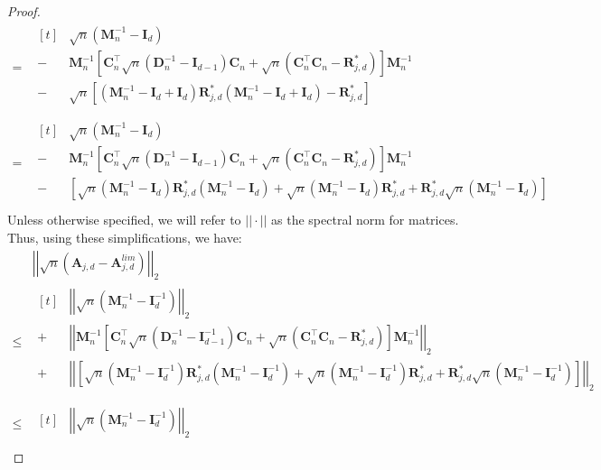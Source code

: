 \documentclass[10pt,a4paper]{amsart}
\newcommand{\bA}{\boldsymbol{A}}
\newcommand{\bC}{\boldsymbol{C}}
\newcommand{\bD}{\boldsymbol{D}}
\newcommand{\bI}{\boldsymbol{I}}
\newcommand{\bM}{\boldsymbol{M}}
\newcommand{\bR}{\boldsymbol{R}}
\begin{document}
\begin{proof}
\begin{equation}
\begin{split}
    = & \!\begin{aligned}[t]
        & \sqrt{n}\left(\bM_n^{-1} - \bI_d\right)\\
        - & \bM_n^{-1}\left[\bC_n^\top \sqrt{n}(\bD_n^{-1} - \bI_{d-1}) \bC_n + \sqrt{n}(\bC_n^\top\bC_n - \bR^*_{j,d})\right]\bM_n^{-1}\\
        - &\sqrt{n}\left[(\bM_n^{-1}-\bI_d + \bI_d)\bR^*_{j,d}(\bM_n^{-1}-\bI_d + \bI_d) - \bR^*_{j,d}\right] \\
    \end{aligned}\\
    = & \!\begin{aligned}[t]
        & \sqrt{n}\left(\bM_n^{-1} - \bI_d\right)\\
        - & \bM_n^{-1}\left[\bC_n^\top \sqrt{n}(\bD_n^{-1} - \bI_{d-1}) \bC_n + \sqrt{n}(\bC_n^\top\bC_n - \bR^*_{j,d})\right]\bM_n^{-1}\\
        - &\left[\sqrt{n}(\bM_n^{-1}-\bI_d)\bR^*_{j,d}(\bM_n^{-1}-\bI_d)+\sqrt{n}(\bM_n^{-1}-\bI_d)\bR^*_{j,d} + \bR^*_{j,d}\sqrt{n}(\bM_n^{-1}-\bI_d)\right] \\
    \end{aligned}
    \end{split}    
\end{equation}
Unless otherwise specified, we will refer to $||\cdot||$ as the spectral norm for matrices. Thus, using these simplifications, we have:
\begin{equation}
    \begin{split}
        & \left|\left|\sqrt{n}\left(\bA_{j,d} - \bA^{lim}_{j,d}\right)\right|\right|_2\\
        \leq & \!\begin{aligned}[t]
        & \left|\left|\sqrt{n}\left(\bM_n^{-1} - \bI^{-1}_d\right)\right|\right|_2\\
        + & \left|\left|\bM_n^{-1}\left[\bC_n^\top \sqrt{n}(\bD_n^{-1} - \bI^{-1}_{d-1}) \bC_n + \sqrt{n}(\bC_n^\top\bC_n - \bR^*_{j,d})\right]\bM_n^{-1}\right|\right|_2\\
        + &
        \left|\left|\left[\sqrt{n}(\bM_n^{-1}-\bI^{-1}_d)\bR^*_{j,d}(\bM_n^{-1}-\bI^{-1}_d)+\sqrt{n}(\bM_n^{-1}-\bI^{-1}_d)\bR^*_{j,d} + \bR^*_{j,d}\sqrt{n}(\bM_n^{-1}-\bI^{-1}_d)\right] \right|\right|_2\\
        \end{aligned}\\
        \leq & \!\begin{aligned}[t]
        & \left|\left|\sqrt{n}\left(\bM_n^{-1} - \bI^{-1}_d\right)\right|\right|_2\\

\end{aligned}
\end{split}
\end{equation}
\end{proof}
\end{document}
